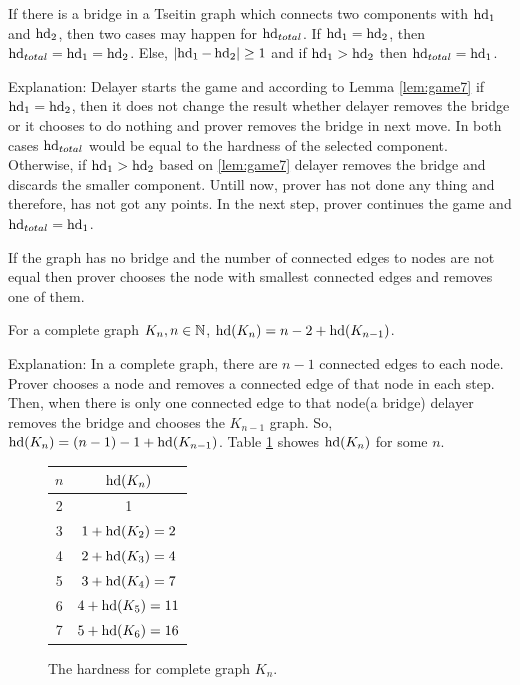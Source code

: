 \documentclass[]{book}
\begin{document}
\begin{conj}\label{con:hd1}
     If there is a bridge in a Tseitin graph which connects two components with $\operatorname{hd}_1$ and $\operatorname{hd}_2$, then two cases may happen for 
	 $\operatorname{hd}_{total}$. If $\operatorname{hd}_1= \operatorname{hd}_2$, then $\operatorname{hd}_{total}= \operatorname{hd}_1= \operatorname{hd}_2$. Else, $ \lvert \operatorname{hd}_1- \operatorname{hd}_2  \rvert \geq 1$
	 and if $ \operatorname{hd}_1 > \operatorname{hd}_2 $  then $\operatorname{hd}_{total}= \operatorname{hd}_1$.
	 
	 Explanation: Delayer starts the game and according to Lemma \ref{lem:game7} if $\operatorname{hd}_1= \operatorname{hd}_2$, then it does not change the result 
	 whether delayer removes the bridge or it chooses to do nothing and prover removes the bridge in next move. In both cases $\operatorname{hd}_{total}$ 
	 would be equal to the hardness of the selected component. Otherwise, if $ \operatorname{hd}_1 > \operatorname{hd}_2 $ based on \ref{lem:game7} delayer 
	 removes the bridge and discards the smaller component. Untill now, prover has not done any thing and therefore, has not got any points.
	 In the next step, prover continues the game and  $\operatorname{hd}_{total}= \operatorname{hd}_1$.
\end{conj}

\begin{conj}\label{con:hd2}
           If the graph has no bridge and the number of connected edges to nodes are not equal then prover chooses the node with smallest
		   connected edges and removes one of them.
\end{conj}
	  
\begin{conj}\label{con:hd_game1}
      For a complete graph $K_n, n \in \mathbb{N}$, $\operatorname{hd}(K_n)= n-2+\operatorname{hd}(K_{n-1})$. 
	  
	  Explanation: In a complete graph, there are $n-1$ connected edges to each node. Prover chooses a node and removes a connected edge of 
	  that node in each step. Then, when there is only one connected edge to that node(a bridge) delayer removes the bridge and chooses the 
	  $K_{n-1}$ graph. So, $\operatorname{hd}(K_n)= (n-1)-1+\operatorname{hd}(K_{n-1}) $.
	  Table \ref{fig:table1} showes $\operatorname{hd}(K_n)$ for some $n$.
	  \begin{figure}[h]
       \centering
       \begin{tabular}{|c|c|} 
                  \hline
                  $n$ & $\operatorname{hd}(K_n)$ \\ \hline
				  2 & 1  \\ \hline
				  3 & $1+ \operatorname{hd}(K_2)=2$ \\ \hline
			      4 & $2+ \operatorname{hd}(K_3)=4$  \\ \hline
				  5 & $3+ \operatorname{hd}(K_4)=7$  \\ \hline
				  6 & $4+ \operatorname{hd}(K_5)=11$  \\ \hline
				  7 & $5+ \operatorname{hd}(K_6)=16$  \\ \hline
       \end{tabular}
       \caption{The hardness for complete graph $K_n$.}
       \label{fig:table1}
      \end{figure}
\end{conj}
\end{document}
